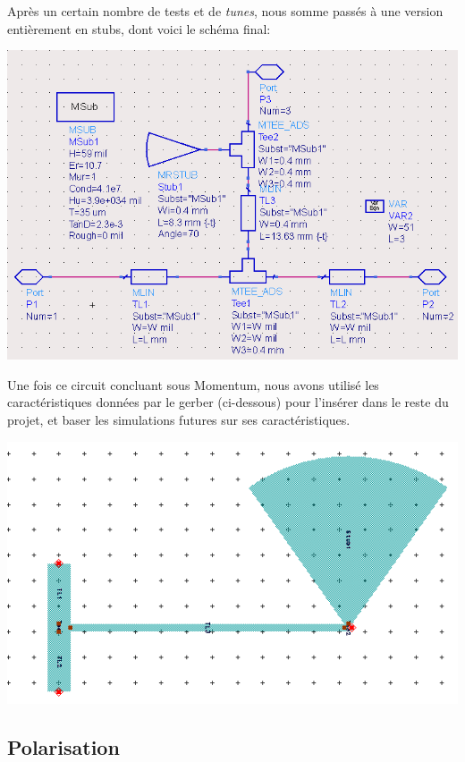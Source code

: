 \documentclass[12pt]{article}
\begin{document}
Après un certain nombre de tests et de \textit{tunes}, nous somme passés à une version entièrement en stubs, dont voici le schéma final:

\begin{center}
\includegraphics[width=\linewidth]{img/circuit_polar_momentum}
\end{center}

Une fois ce circuit concluant sous Momentum, nous avons utilisé les caractéristiques données par le gerber (ci-dessous) pour l’insérer dans le reste du projet, et baser les simulations futures sur ses caractéristiques.

\begin{center}
\includegraphics[width=\linewidth]{img/gerber_polar}
\end{center}

\subsection{Polarisation}
\end{document}
